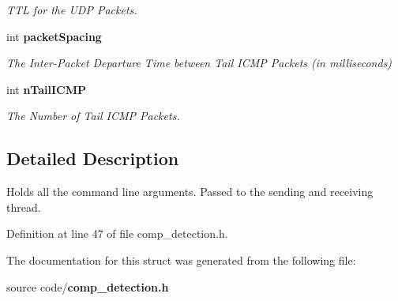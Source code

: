 \begin{DoxyCompactItemize}
\begin{DoxyCompactList}\small\item\em T\-T\-L for the U\-D\-P Packets. \end{DoxyCompactList}\item 
int {\bf packet\-Spacing}\label{structargs_af55942e03e0e4c2a9155b9d15e19f793}

\begin{DoxyCompactList}\small\item\em The Inter-\/\-Packet Departure Time between Tail I\-C\-M\-P Packets (in milliseconds) \end{DoxyCompactList}\item 
int {\bf n\-Tail\-I\-C\-M\-P}\label{structargs_ab565ed3f4e45736a683cfaf5f69f8651}

\begin{DoxyCompactList}\small\item\em The Number of Tail I\-C\-M\-P Packets. \end{DoxyCompactList}\end{DoxyCompactItemize}


\subsection{Detailed Description}
Holds all the command line arguments. Passed to the sending and receiving thread. 

Definition at line 47 of file comp\-\_\-detection.\-h.



The documentation for this struct was generated from the following file\-:\begin{DoxyCompactItemize}
\item 
source code/{\bf comp\-\_\-detection.\-h}\end{DoxyCompactItemize}
